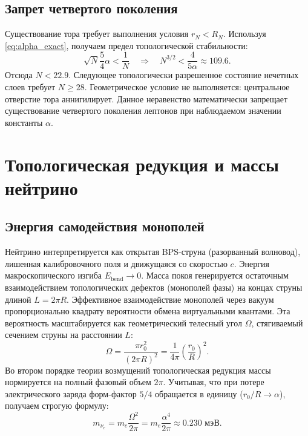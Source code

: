 \documentclass[12pt,a4paper]{article}
\begin{document}
\subsection{Запрет четвертого поколения}
Существование тора требует выполнения условия $r_N < R_N$. Используя \eqref{eq:alpha_exact}, получаем предел топологической стабильности:
\begin{equation}
\sqrt{N} \frac{5}{4} \alpha < \frac{1}{N} \quad \Longrightarrow \quad N^{3/2} < \frac{4}{5\alpha} \approx 109.6.
\end{equation}
Отсюда $N < 22.9$. Следующее топологически разрешенное состояние нечетных слоев требует $N \ge 28$. Геометрическое условие не выполняется: центральное отверстие тора аннигилирует. Данное неравенство математически запрещает существование четвертого поколения лептонов при наблюдаемом значении константы $\alpha$.

\section{Топологическая редукция и массы нейтрино}

\subsection{Энергия самодействия монополей}
Нейтрино интерпретируется как открытая BPS-струна (разорванный волновод), лишенная калибровочного поля и движущаяся со скоростью $c$. Энергия макроскопического изгиба $E_{\text{bend}} \to 0$. Масса покоя генерируется остаточным взаимодействием топологических дефектов (монополей фазы) на концах струны длиной $L = 2\pi R$.
Эффективное взаимодействие монополей через вакуум пропорционально квадрату вероятности обмена виртуальными квантами. Эта вероятность масштабируется как геометрический телесный угол $\Omega$, стягиваемый сечением струны на расстоянии $L$:
\begin{equation}
\Omega = \frac{\pi r_0^2}{(2\pi R)^2} = \frac{1}{4\pi} \left( \frac{r_0}{R} \right)^2.
\end{equation}
Во втором порядке теории возмущений топологическая редукция массы нормируется на полный фазовый объем $2\pi$. Учитывая, что при потере электрического заряда форм-фактор $5/4$ обращается в единицу ($r_0/R \to \alpha$), получаем строгую формулу:
\begin{equation}
m_{\nu_e} = m_e \frac{\Omega^2}{2\pi} = m_e \frac{\alpha^4}{2\pi} \approx 0.230 \text{ мэВ}.
\label{eq:neutrino_mass_exact}
\end{equation}
\end{document}

